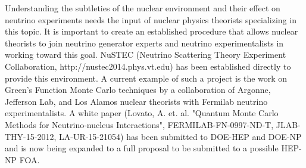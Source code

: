 

Understanding the subtleties of the nuclear environment and their
effect on neutrino experiments needs the input of nuclear physics
theorists specializing in this topic. It is important to create an
established procedure that allows nuclear theorists to join neutrino
generator experts and neutrino experimentalists in working toward this
goal. NuSTEC (Neutrino Scattering Theory Experiment Collaboration,
http://nustec2014.phys.vt.edu) has been established directly to
provide this environment.
A current example of such a project is the work on Green's Function
Monte Carlo techniques by a collaboration of Argonne, Jefferson Lab,
and Los Alamos nuclear theorists with Fermilab neutrino
experimentalists.  A white paper (Lovato, A. et. al. "Quantum Monte
Carlo Methods for Neutrino-nucleus Interactions",
FERMILAB-FN-0997-ND-T, JLAB-THY-15-2012, LA-UR-15-21054) has been
submitted to DOE-HEP and DOE-NP and is now being expanded to a
full proposal to be submitted to a possible HEP-NP FOA.

